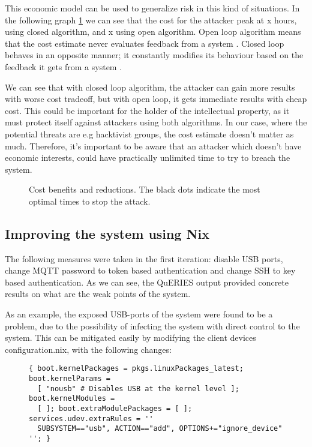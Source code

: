 This economic model can be used to generalize risk in this kind of
situations. In the following graph \ref{openandclosed} we can see that
the cost for the attacker peak at x hours, using closed algorithm, and
x using open algorithm. Open loop algorithm means that the cost
estimate never evaluates feedback from a system \cite{bars2006theory}. Closed loop behaves
in an opposite manner; it constantly modifies its behaviour based on
the feedback it gets from a system \cite{bars2006theory}. 

We can see that with closed loop algorithm, the attacker can gain more
results with worse cost tradeoff, but with open loop, it gets
immediate results with cheap cost. This could be important for the holder of
the intellectual property, as it must protect itself against attackers
using both algorithms. In our case, where the potential threats are
e.g hacktivist groups, the cost estimate doesn't matter as
much. Therefore, it's important to be aware that an attacker which
doesn't have economic interests, could have practically unlimited time
to try to breach the system.

\begin{figure}[t!]
\centerline{}
\caption{Cost benefits and reductions. The black dots indicate the most optimal
  times to stop the attack.}
\label{openandclosed}
\end{figure}

\subsection{Improving the system using Nix}

The following measures were taken in the first iteration: disable USB
ports, change MQTT password to token based authentication and change
SSH to key based authentication. As we can see, the QuERIES output
provided concrete results on what are the weak points of the
system. 

As an example, the exposed USB-ports of the system were found to be a
problem, due to the possibility of infecting the system with direct
control to the system. This can be mitigated easily by modifying the
client devices configuration.nix, with the following changes:

\begin{figure}[H]
\begin{lstlisting} 
{ boot.kernelPackages = pkgs.linuxPackages_latest; boot.kernelParams =
  [ "nousb" # Disables USB at the kernel level ]; boot.kernelModules =
  [ ]; boot.extraModulePackages = [ ]; services.udev.extraRules = ''
  SUBSYSTEM=="usb", ACTION=="add", OPTIONS+="ignore_device" ''; }
\end{lstlisting}
\label{kernelsnippet}
\end{figure}

